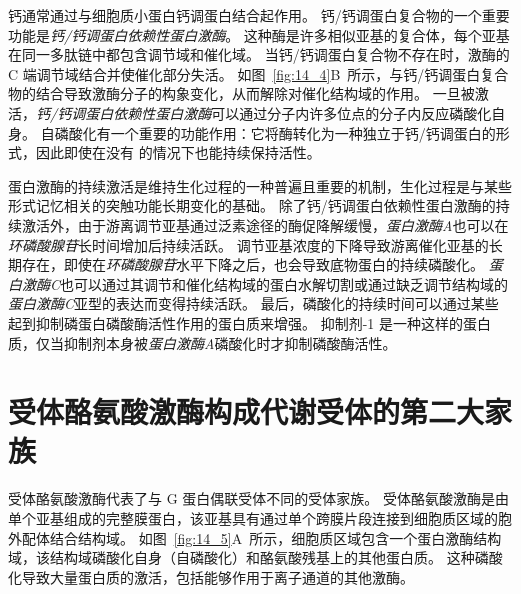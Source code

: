钙通常通过与细胞质小蛋白钙调蛋白结合起作用。
钙/钙调蛋白复合物的一个重要功能是\textit{钙/钙调蛋白依赖性蛋白激酶}。
这种酶是许多相似亚基的复合体，每个亚基在同一多肽链中都包含调节域和催化域。
当钙/钙调蛋白复合物不存在时，激酶的 C 端调节域结合并使催化部分失活。
如图~\ref{fig:14_4}B~所示，与钙/钙调蛋白复合物的结合导致激酶分子的构象变化，从而解除对催化结构域的作用。
一旦被激活，\textit{钙/钙调蛋白依赖性蛋白激酶}可以通过分子内许多位点的分子内反应磷酸化自身。
自磷酸化有一个重要的功能作用：它将酶转化为一种独立于钙/钙调蛋白的形式，因此即使在没有  的情况下也能持续保持活性。


蛋白激酶的持续激活是维持生化过程的一种普遍且重要的机制，生化过程是与某些形式记忆相关的突触功能长期变化的基础。
除了钙/钙调蛋白依赖性蛋白激酶的持续激活外，由于游离调节亚基通过泛素途径的酶促降解缓慢，\textit{蛋白激酶A}也可以在\textit{环磷酸腺苷}长时间增加后持续活跃。
调节亚基浓度的下降导致游离催化亚基的长期存在，即使在\textit{环磷酸腺苷}水平下降之后，也会导致底物蛋白的持续磷酸化。
\textit{蛋白激酶C}也可以通过其调节和催化结构域的蛋白水解切割或通过缺乏调节结构域的\textit{蛋白激酶C}亚型的表达而变得持续活跃。
最后，磷酸化的持续时间可以通过某些起到抑制磷蛋白磷酸酶活性作用的蛋白质来增强。
抑制剂-1 是一种这样的蛋白质，仅当抑制剂本身被\textit{蛋白激酶A}磷酸化时才抑制磷酸酶活性。



\section{受体酪氨酸激酶构成代谢受体的第二大家族}

受体酪氨酸激酶代表了与 G 蛋白偶联受体不同的受体家族。
受体酪氨酸激酶是由单个亚基组成的完整膜蛋白，该亚基具有通过单个跨膜片段连接到细胞质区域的胞外配体结合结构域。
如图~\ref{fig:14_5}A~所示，细胞质区域包含一个蛋白激酶结构域，该结构域磷酸化自身（自磷酸化）和酪氨酸残基上的其他蛋白质。
这种磷酸化导致大量蛋白质的激活，包括能够作用于离子通道的其他激酶。


